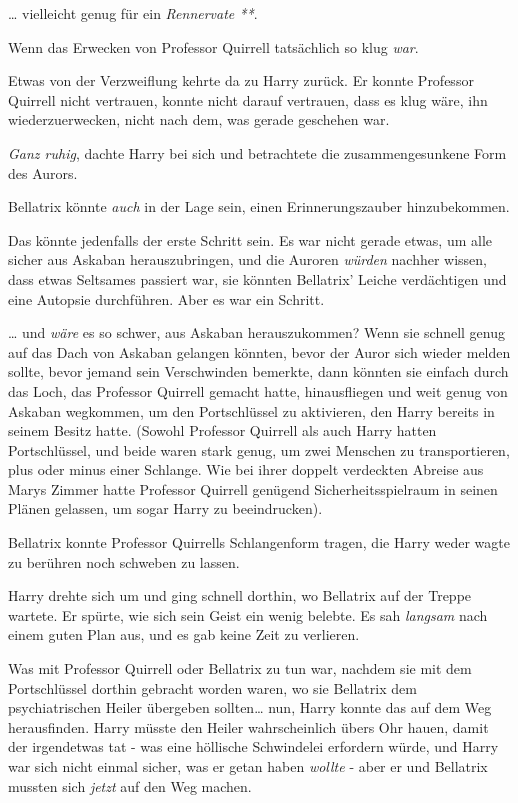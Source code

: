 {… vielleicht genug für ein \emph{Rennervate **}.

Wenn das Erwecken von Professor Quirrell tatsächlich so klug \emph{war}.

Etwas von der Verzweiflung kehrte da zu Harry zurück. Er konnte Professor Quirrell nicht vertrauen, konnte nicht darauf vertrauen, dass es klug wäre, ihn wiederzuerwecken, nicht nach dem, was gerade geschehen war.

\emph{Ganz ruhig}, dachte Harry bei sich und betrachtete die zusammengesunkene Form des Aurors.

Bellatrix könnte \emph{auch} in der Lage sein, einen Erinnerungszauber hinzubekommen.

Das könnte jedenfalls der erste Schritt sein. Es war nicht gerade etwas, um alle sicher aus Askaban herauszubringen, und die Auroren \emph{würden} nachher wissen, dass etwas Seltsames passiert war, sie könnten Bellatrix' Leiche verdächtigen und eine Autopsie durchführen. Aber es war ein Schritt.

… und \emph{wäre} es so schwer, aus Askaban herauszukommen? Wenn sie schnell genug auf das Dach von Askaban gelangen könnten, bevor der Auror sich wieder melden sollte, bevor jemand sein Verschwinden bemerkte, dann könnten sie einfach durch das Loch, das Professor Quirrell gemacht hatte, hinausfliegen und weit genug von Askaban wegkommen, um den Portschlüssel zu aktivieren, den Harry bereits in seinem Besitz hatte. (Sowohl Professor Quirrell als auch Harry hatten Portschlüssel, und beide waren stark genug, um zwei Menschen zu transportieren, plus oder minus einer Schlange. Wie bei ihrer doppelt verdeckten Abreise aus Marys Zimmer hatte Professor Quirrell genügend Sicherheitsspielraum in seinen Plänen gelassen, um sogar Harry zu beeindrucken).

Bellatrix konnte Professor Quirrells Schlangenform tragen, die Harry weder wagte zu berühren noch schweben zu lassen.

Harry drehte sich um und ging schnell dorthin, wo Bellatrix auf der Treppe wartete. Er spürte, wie sich sein Geist ein wenig belebte. Es sah \emph{langsam} nach einem guten Plan aus, und es gab keine Zeit zu verlieren.

Was mit Professor Quirrell oder Bellatrix zu tun war, nachdem sie mit dem Portschlüssel dorthin gebracht worden waren, wo sie Bellatrix dem psychiatrischen Heiler übergeben sollten… nun, Harry konnte das auf dem Weg herausfinden. Harry müsste den Heiler wahrscheinlich übers Ohr hauen, damit der irgendetwas tat - was eine höllische Schwindelei erfordern würde, und Harry war sich nicht einmal sicher, was er getan haben \emph{wollte} - aber er und Bellatrix mussten sich \emph{jetzt} auf den Weg machen.

}
